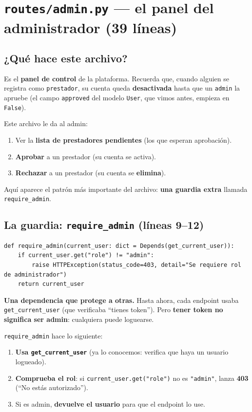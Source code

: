 \documentclass[11pt,a4paper]{article}
\begin{document}
\section{\texttt{routes/admin.py} --- el panel del administrador (39 líneas)}

\subsection{¿Qué hace este archivo?}

Es el \textbf{panel de control} de la plataforma. Recuerda que, cuando alguien se registra como
\texttt{prestador}, su cuenta queda \textbf{desactivada} hasta que un \texttt{admin} la apruebe
(el campo \texttt{approved} del modelo \texttt{User}, que vimos antes, empieza en
\texttt{False}).

Este archivo le da al admin:
\begin{enumerate}
    \item Ver la \textbf{lista de prestadores pendientes} (los que esperan aprobación).
    \item \textbf{Aprobar} a un prestador (su cuenta se activa).
    \item \textbf{Rechazar} a un prestador (su cuenta se \textbf{elimina}).
\end{enumerate}

Aquí aparece el patrón más importante del archivo: \textbf{una guardia extra} llamada
\texttt{require\_admin}.

\subsection{La guardia: \texttt{require\_admin} (líneas 9--12)}

\begin{lstlisting}
def require_admin(current_user: dict = Depends(get_current_user)):
    if current_user.get("role") != "admin":
        raise HTTPException(status_code=403, detail="Se requiere rol de administrador")
    return current_user
\end{lstlisting}

\textbf{Una dependencia que protege a otras.} Hasta ahora, cada endpoint usaba
\texttt{get\_current\_user} (que verificaba ``tienes token''). Pero \textbf{tener token no
significa ser admin}: cualquiera puede loguearse.

\texttt{require\_admin} hace lo siguiente:
\begin{enumerate}
    \item \textbf{Usa \texttt{get\_current\_user}} (ya lo conocemos: verifica que haya un
    usuario logueado).
    \item \textbf{Comprueba el rol}: si \texttt{current\_user.get("role")} no es
    \texttt{"admin"}, lanza \textbf{403} (``No estás autorizado'').
    \item Si es admin, \textbf{devuelve el usuario} para que el endpoint lo use.
\end{enumerate}
\end{document}
